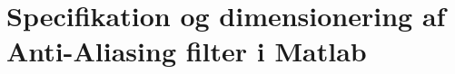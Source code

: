 \chapter{Specifikation og dimensionering af Anti-Aliasing filter i Matlab}
\label{bilag:aafilterspec}

